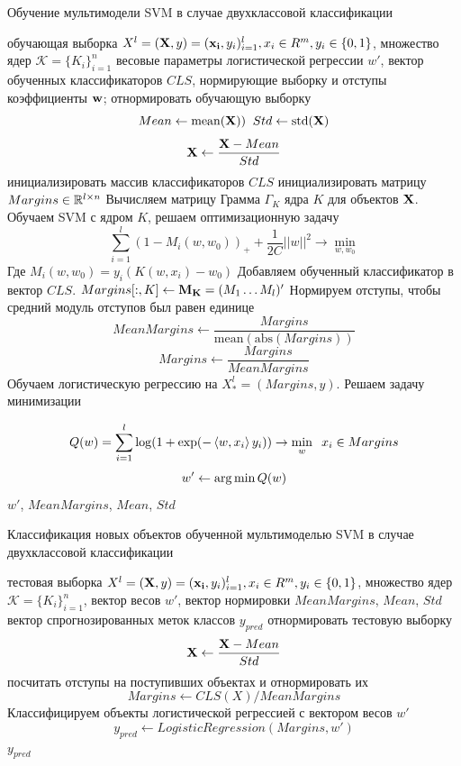 \documentclass[12pt,twoside]{article}
\newcommand{\lto}{\leftarrow}
\begin{document}
\begin{algorithm}[!h]
	\caption{Обучение мультимодели SVM в случае двухклассовой классификации}
	\label{alg:svm}
	\begin{algorithmic}
	\REQUIRE обучающая выборка $X^l = (\mathbf{X}, y) = (\mathbf{x_i}, y_i)_{i=1}^l, x_i \in R^m, y_i \in \{0, 1\}$, множество ядер $\mathcal{K} = \{K_i\}_{i=1}^n$
	\ENSURE весовые параметры логистической регрессии $w'$, вектор обученных классификаторов $CLS$, нормирующие выборку и отступы коэффициенты
	$\mathbf{w}$;
	\BEGIN
		\STATE отнормировать обучающую выборку 
		$$
		Mean \lto \mathrm{mean}(\v{X}))\;\; Std \lto \mathrm{std}(\v{X})
		$$
		$$
		\v{X} \lto \frac{\v{X} - Mean}{Std}
		$$
		\STATE инициализировать массив классификаторов $CLS$
		\STATE инициализировать матрицу $Margins \in \R^{l\times n}$
			\STATE Вычисляем матрицу Грамма $\Gamma_K$ ядра $K$ для объектов $\mathbf{X}$.
			\STATE Обучаем SVM с ядром $K$, решаем оптимизационную задачу
			$$
			\sum_{i=1}^l (1 - M_i(w, w_0))_+ + \frac{1}{2C}||w||^2 \to \min_{w, w_0}
			$$
			Где $M_i(w, w_0) = y_i(K(w, x_i) - w_0)$
			\STATE Добавляем обученный классификатор в вектор $CLS$.
			\STATE $Margins[:, K] \lto \v{M_K} = (M_1\ldots M_l)'$
		\ENDFOR
		\STATE Нормируем отступы, чтобы средний модуль отступов был равен единице 
			$$
			MeanMargins \lto \frac{Margins}{\mathrm{mean}(\mathrm{abs}(Margins))}
			$$
			$$
			Margins \lto \frac{Margins}{MeanMargins}
			$$
		\STATE Обучаем логистическую регрессию на $X^l_* = (Margins, y)$. Решаем задачу минимизации
		
		$$
		Q(w) = \sum_{i=1}^l \log(1 + \mathrm{exp}(-\rbrs{w, x_i}y_i)) \to \min_w\;\;x_i \in Margins
		$$
		$$
		w' \lto \argmin{Q(w)}
		$$
		\RETURN $w'$, $MeanMargins$, $Mean$, $Std$
	\end{algorithmic}
	\end{algorithm}
\begin{algorithm}[!h]
	\caption{Классификация новых объектов обученной мультимоделью SVM в случае двухклассовой классификации}
	\label{alg:svm}
	\begin{algorithmic}
	\REQUIRE тестовая выборка $X^l = (\mathbf{X}, y) = (\mathbf{x_i}, y_i)_{i=1}^l, x_i \in R^m, y_i \in \{0, 1\}$, множество ядер $\mathcal{K} = \{K_i\}_{i=1}^n$, вектор весов $w'$, вектор нормировки $MeanMargins$, $Mean$, $Std$
	\ENSURE вектор спрогнозированных меток классов $y_{pred}$
	\BEGIN
		\STATE отнормировать тестовую выборку 
		$$
		\v{X} \lto \frac{\v{X} - Mean}{Std}
		$$
		\STATE посчитать отступы на поступивших объектах и отнормировать их
		$$
		Margins \lto CLS(X) / MeanMargins
		$$
		\STATE Классифицируем объекты логистической регрессией с вектором весов $w'$
		$$
		y_{pred} \lto LogisticRegression(Margins, w')
		$$
		\RETURN $y_{pred}$
	\end{algorithmic}
	\end{algorithm}

\newpage



\end{document}

